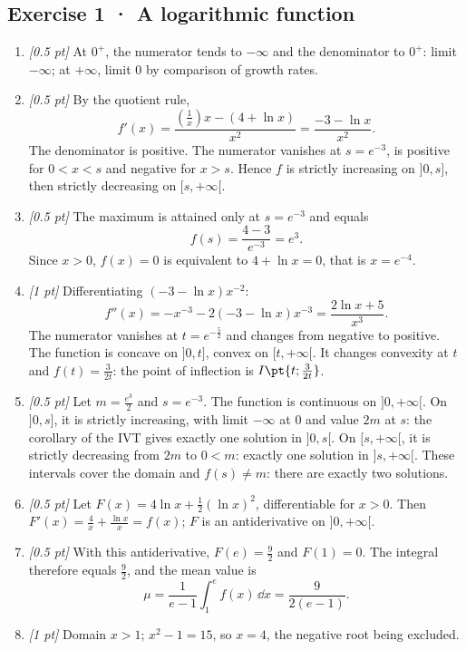 \subsection*{Exercise 1 · A logarithmic function}\begin{enumerate}

\item \textit{[0.5 pt]} At $0^+$, the numerator tends to $-\infty$ and the denominator to $0^+$: limit $-\infty$; at $+\infty$, limit $0$ by comparison of growth rates.

\item \textit{[0.5 pt]} By the quotient rule,
\[f'(x)=\frac{(\frac{1}{x})x-(4+\ln x)}{x^2}=\frac{-3-\ln x}{x^2}.\]
The denominator is positive. The numerator vanishes at $s=e^{-3}$, is positive for $0<x<s$ and negative for $x>s$. Hence $f$ is strictly increasing on $]0,s]$, then strictly decreasing on $[s,+\infty[$.

\item \textit{[0.5 pt]} The maximum is attained only at $s=e^{-3}$ and equals
\[f(s)=\frac{4- 3}{e^{-3}}=e^{3}.\]
Since $x>0$, $f(x)=0$ is equivalent to $4+\ln x=0$, that is $x=e^{-4}$.

\item \textit{[1 pt]} Differentiating $(-3-\ln x)x^{-2}$:
\[f''(x)=-x^{-3}-2(-3-\ln x)x^{-3}=\frac{2\ln x+5}{x^3}.\]
The numerator vanishes at $t=e^{-\frac{5}{2}}$ and changes from negative to positive. The function is concave on $]0,t]$, convex on $[t,+\infty[$. It changes convexity at $t$ and $f(t)=\frac{3}{2t}$: the point of inflection is $I\pt{t;\frac{3}{2t}}$.

\item \textit{[0.5 pt]} Let $m=\frac{e^{3}}{2}$ and $s=e^{-3}$. The function is continuous on $]0,+\infty[$. On $]0,s]$, it is strictly increasing, with limit $-\infty$ at $0$ and value $2m$ at $s$: the corollary of the IVT gives exactly one solution in $]0,s[$. On $[s,+\infty[$, it is strictly decreasing from $2m$ to $0<m$: exactly one solution in $]s,+\infty[$. These intervals cover the domain and $f(s)\ne m$: there are exactly two solutions.

\item \textit{[0.5 pt]} Let $F(x)=4\ln x+\frac12(\ln x)^2$, differentiable for $x>0$. Then $F'(x)=\frac{4}{x}+\frac{\ln x}{x}=f(x)$; $F$ is an antiderivative on $]0,+\infty[$.

\item \textit{[0.5 pt]} With this antiderivative, $F(e)=\frac{9}{2}$ and $F(1)=0$. The integral therefore equals $\frac{9}{2}$, and the mean value is
\[\mu=\frac{1}{e-1}\int_1^e f(x)\,\dd x=\frac{9}{2(e-1)}.\]

\item \textit{[1 pt]} Domain $x>1$; $x^2-1=15$, so $x=4$, the negative root being excluded.

\end{enumerate}

